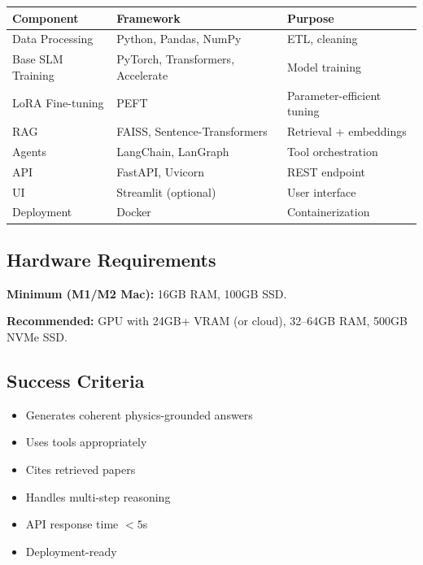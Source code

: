 \documentclass[11pt]{article}
\begin{document}
\begin{table}[H]
\centering
\tiny
\begin{tabular}{|l|l|l|}
\hline
\textbf{Component} & \textbf{Framework} & \textbf{Purpose} \\
\hline
Data Processing & Python, Pandas, NumPy & ETL, cleaning \\
\hline
Base SLM Training & PyTorch, Transformers, Accelerate & Model training \\
\hline
LoRA Fine-tuning & PEFT & Parameter-efficient tuning \\
\hline
RAG & FAISS, Sentence-Transformers & Retrieval + embeddings \\
\hline
Agents & LangChain, LanGraph & Tool orchestration \\
\hline
API & FastAPI, Uvicorn & REST endpoint \\
\hline
UI & Streamlit (optional) & User interface \\
\hline
Deployment & Docker & Containerization \\
\hline
\end{tabular}
\end{table}

\subsection{Hardware Requirements}

\textbf{Minimum (M1/M2 Mac):} 16GB RAM, 100GB SSD.

\textbf{Recommended:} GPU with 24GB+ VRAM (or cloud), 32--64GB RAM, 500GB NVMe SSD.

\subsection{Success Criteria}

\begin{itemize}[leftmargin=1.2em]
  \item Generates coherent physics-grounded answers
  \item Uses tools appropriately
  \item Cites retrieved papers
  \item Handles multi-step reasoning
  \item API response time $< 5$s
  \item Deployment-ready
\end{itemize}
\end{document}
